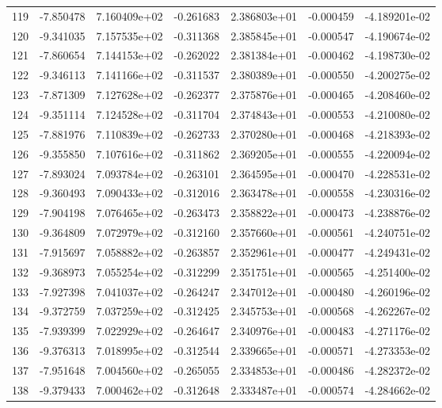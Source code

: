 \begin{tabular}{rrrrrrr}
 119 &  -7.850478 &  7.160409e+02 & -0.261683 &  2.386803e+01 &   -0.000459 & -4.189201e-02 \\
 120 &  -9.341035 &  7.157535e+02 & -0.311368 &  2.385845e+01 &   -0.000547 & -4.190674e-02 \\
 121 &  -7.860654 &  7.144153e+02 & -0.262022 &  2.381384e+01 &   -0.000462 & -4.198730e-02 \\
 122 &  -9.346113 &  7.141166e+02 & -0.311537 &  2.380389e+01 &   -0.000550 & -4.200275e-02 \\
 123 &  -7.871309 &  7.127628e+02 & -0.262377 &  2.375876e+01 &   -0.000465 & -4.208460e-02 \\
 124 &  -9.351114 &  7.124528e+02 & -0.311704 &  2.374843e+01 &   -0.000553 & -4.210080e-02 \\
 125 &  -7.881976 &  7.110839e+02 & -0.262733 &  2.370280e+01 &   -0.000468 & -4.218393e-02 \\
 126 &  -9.355850 &  7.107616e+02 & -0.311862 &  2.369205e+01 &   -0.000555 & -4.220094e-02 \\
 127 &  -7.893024 &  7.093784e+02 & -0.263101 &  2.364595e+01 &   -0.000470 & -4.228531e-02 \\
 128 &  -9.360493 &  7.090433e+02 & -0.312016 &  2.363478e+01 &   -0.000558 & -4.230316e-02 \\
 129 &  -7.904198 &  7.076465e+02 & -0.263473 &  2.358822e+01 &   -0.000473 & -4.238876e-02 \\
 130 &  -9.364809 &  7.072979e+02 & -0.312160 &  2.357660e+01 &   -0.000561 & -4.240751e-02 \\
 131 &  -7.915697 &  7.058882e+02 & -0.263857 &  2.352961e+01 &   -0.000477 & -4.249431e-02 \\
 132 &  -9.368973 &  7.055254e+02 & -0.312299 &  2.351751e+01 &   -0.000565 & -4.251400e-02 \\
 133 &  -7.927398 &  7.041037e+02 & -0.264247 &  2.347012e+01 &   -0.000480 & -4.260196e-02 \\
 134 &  -9.372759 &  7.037259e+02 & -0.312425 &  2.345753e+01 &   -0.000568 & -4.262267e-02 \\
 135 &  -7.939399 &  7.022929e+02 & -0.264647 &  2.340976e+01 &   -0.000483 & -4.271176e-02 \\
 136 &  -9.376313 &  7.018995e+02 & -0.312544 &  2.339665e+01 &   -0.000571 & -4.273353e-02 \\
 137 &  -7.951648 &  7.004560e+02 & -0.265055 &  2.334853e+01 &   -0.000486 & -4.282372e-02 \\
 138 &  -9.379433 &  7.000462e+02 & -0.312648 &  2.333487e+01 &   -0.000574 & -4.284662e-02 \\

\end{tabular}
